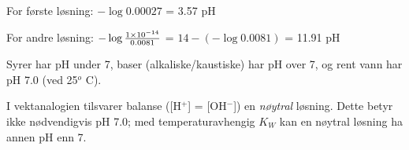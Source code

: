For første løsning: $- \log 0.00027$ = 3.57 pH

\vskip 10pt

For andre løsning: $- \log {1 \times 10^{-14} \over 0.0081}$ = $14 - (- \log 0.0081)$ = 11.91 pH

\vskip 10pt

Syrer har pH under 7, baser (alkaliske/kaustiske) har pH over 7, og rent vann har pH 7.0 (ved 25$^{o}$ C).

\vskip 10pt

I vektanalogien tilsvarer balanse ([H$^{+}$] = [OH$^{-}$]) en {\it nøytral} løsning. Dette betyr ikke nødvendigvis pH 7.0; med temperaturavhengig $K_W$ kan en nøytral løsning ha annen pH enn 7.












